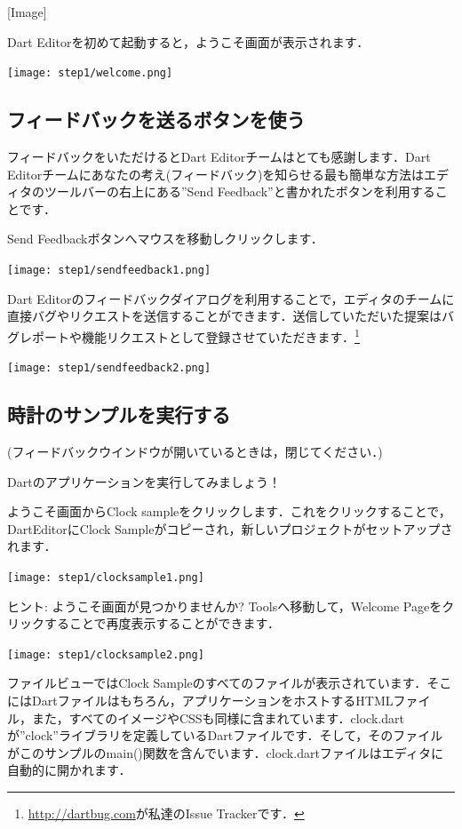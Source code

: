 [Image]

Dart Editorを初めて起動すると，ようこそ画面が表示されます．

\texttt{[image: step1/welcome.png]}

\subsection{フィードバックを送るボタンを使う}

フィードバックをいただけるとDart Editorチームはとても感謝します．Dart Editorチームにあなたの考え(フィードバック)を知らせる最も簡単な方法はエディタのツールバーの右上にある''Send Feedback''と書かれたボタンを利用することです．

Send Feedbackボタンへマウスを移動しクリックします．

\texttt{[image: step1/sendfeedback1.png]}

Dart Editorのフィードバックダイアログを利用することで，エディタのチームに直接バグやリクエストを送信することができます．送信していただいた提案はバグレポートや機能リクエストとして登録させていただきます．\footnote{\url{http://dartbug.com}が私達のIssue Trackerです．}

\texttt{[image: step1/sendfeedback2.png]}

\subsection{時計のサンプルを実行する}

(フィードバックウインドウが開いているときは，閉じてください．)

Dartのアプリケーションを実行してみましょう！

ようこそ画面からClock sampleをクリックします．これをクリックすることで，DartEditorにClock Sampleがコピーされ，新しいプロジェクトがセットアップされます．

\texttt{[image: step1/clocksample1.png]}

ヒント: ようこそ画面が見つかりませんか? Toolsへ移動して，Welcome Pageをクリックすることで再度表示することができます．

\texttt{[image: step1/clocksample2.png]}

ファイルビューではClock Sampleのすべてのファイルが表示されています．そこにはDartファイルはもちろん，アプリケーションをホストするHTMLファイル，また，すべてのイメージやCSSも同様に含まれています．clock.dartが''clock''ライブラリを定義しているDartファイルです．そして，そのファイルがこのサンプルのmain()関数を含んでいます．clock.dartファイルはエディタに自動的に開かれます．

